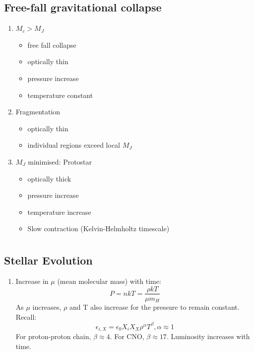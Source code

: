 \documentclass[a4paper,11pt,normalem]{article}
\begin{document}
\subsection{Free-fall gravitational collapse}

\begin{enumerate}
    \item \(M_c > M_J\)
        \begin{itemize}
            \item free fall collapse
            \item optically thin
            \item pressure increase
            \item temperature constant
        \end{itemize} 
    \item Fragmentation
        \begin{itemize}
            \item optically thin
            \item individual regions exceed local \(M_J\)
        \end{itemize} 
    \item \(M_J\) minimised: Protostar
        \begin{itemize}
            \item optically thick
            \item pressure increase
            \item temperature increase
            \item Slow contraction (Kelvin-Helmholtz timescale)
        \end{itemize}
\end{enumerate}

\section{}
\subsection{Stellar Evolution}

\begin{enumerate}
    \item Increase in \(\mu\) (mean molecular mass) with time:
        \[
            P = nkT = \frac{\rho kT}{\mu m_H}
        \]
        As \(\mu\) increases, \(\rho\) and T also increase for the pressure to remain constant.
        Recall:
        \[
            \epsilon_{i,X} = \epsilon_0 X_i X_X \rho^\alpha T^\beta, \alpha \approx 1
        \]
        For proton-proton chain, \(\beta \approx 4\).
        For CNO, \(\beta \approx 17\).
        Luminosity increases with time.
\end{enumerate}
\end{document}
